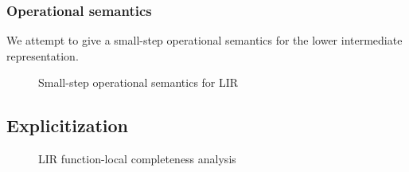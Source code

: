 \documentclass[index.tex]{subfiles}
\begin{document}
\subsubsection{Operational semantics}
\label{sec:lir-operational-semantics}
We attempt to give a small-step operational semantics for the lower intermediate representation.

\begin{figure}[htb!]
  \caption{Small-step operational semantics for LIR}
  \label{fig:lir-ssos}
\end{figure}

\subsection{Explicitization}
\label{sec:explicitization}

\begin{figure}[htb!]
  \caption{LIR function-local completeness analysis}
  \label{fig:lir-completeness-analysis-local}
\end{figure}
   
\end{document}
